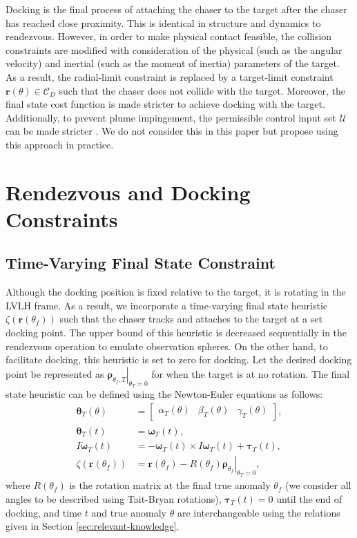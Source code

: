 Docking is the final process of attaching the chaser to the target after the chaser has reached close proximity.
This is identical in structure and dynamics to rendezvous.
However, in order to make physical contact feasible, the collision constraints are modified with consideration of the physical (such as the angular velocity) and inertial (such as the moment of inertia) parameters of the target.
As a result, the radial-limit constraint is replaced by a target-limit constraint $\boldsymbol{r}(\theta)\in{\mathcal{C}}_D$ such that the chaser does not collide with the target.
Moreover, the final state cost function is made stricter to achieve docking with the target.
Additionally, to prevent plume impingement, the permissible control input set ${\mathcal{U}}$ can be made stricter \cite{starek2017fast}.
We do not consider this in this paper but propose using this approach in practice.

\section{Rendezvous and Docking Constraints} \label{sec:constraints}
\subsection{Time-Varying Final State Constraint}
\label{sec:time-varying-final-state-constraint}
Although the docking position is fixed relative to the target, it is rotating in the LVLH frame.
As a result, we incorporate a time-varying final state heuristic $\zeta(\boldsymbol{r}(\theta_f))$ such that the chaser tracks and attaches to the target at a set docking point.
The upper bound of this heuristic is decreased sequentially in the rendezvous operation to emulate observation spheres.
On the other hand, to facilitate docking, this heuristic is set to zero for docking.
Let the desired docking point be represented as $\left.\boldsymbol{\rho}_{\theta_f,T}\right|_{\theta_T=0}$ for when the target is at no rotation.
The final state heuristic can be defined using the Newton-Euler equations as follows:
\begin{align}
    \boldsymbol{\theta}_T(\theta)&=\begin{bmatrix}\alpha_T(\theta)&\beta_T(\theta)&\gamma_T(\theta)\end{bmatrix},\\
    \dot{\boldsymbol{\theta}}_T(t)&=\boldsymbol{\omega}_T(t),\\
    I\dot{\boldsymbol{\omega}}_T(t)&=-\boldsymbol{\omega}_T(t)\times I\boldsymbol{\omega}_T(t) + \boldsymbol{\tau}_T(t),\\
    \zeta(\boldsymbol{r}(\theta_f))&=\boldsymbol{r}(\theta_f)-\left.R(\theta_f)\boldsymbol{\rho}_{\theta_f}\right|_{\theta_T=0},
\end{align}
where $R(\theta_f)$ is the rotation matrix at the final true anomaly $\theta_f$ (we consider all angles to be described using Tait-Bryan rotations), $\boldsymbol{\tau}_T(t)=0$ until the end of docking, and time $t$ and true anomaly $\theta$ are interchangeable using the relations given in Section \ref{sec:relevant-knowledge}.

